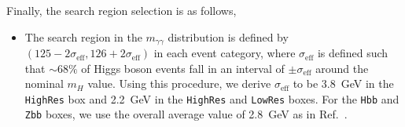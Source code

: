 Finally, the search region selection is as follows,
\begin{itemize}
\item The search region in the $m_{\gamma\gamma}$ distribution is
    defined by $(125 - 2\sigma_{\mathrm{eff}},
    126+2\sigma_{\mathrm{eff}})$ in each event category, where
    $\sigma_{\mathrm{eff}}$ is defined such that $\sim68\%$ of Higgs
    boson events fall in an interval of $\pm\sigma_{\mathrm{eff}}$
    around the nominal $m_H$ value. Using this procedure, we derive
    $\sigma_{\mathrm{eff}}$ to be 3.8~GeV in the \texttt{HighRes} box
    and 2.2~GeV in the  \texttt{HighRes} and \texttt{LowRes}
    boxes. For the \texttt{Hbb} and \texttt{Zbb} boxes, we use the overall average value
    of 2.8~GeV as in Ref.~\cite{RazorHgaga}.
\end{itemize}

